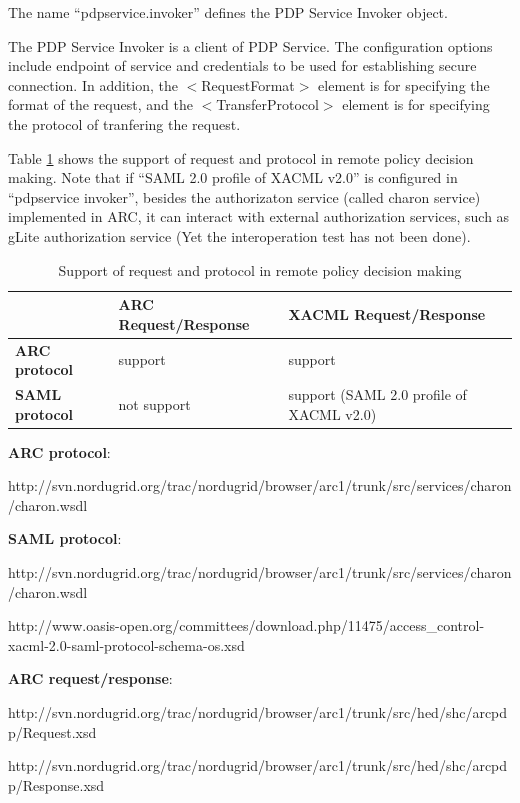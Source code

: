 \documentclass{article}                            %
\begin{document}
The name ``pdpservice.invoker'' defines the PDP Service Invoker object.

The PDP Service Invoker is a client of PDP Service. The configuration options include endpoint of service and credentials to be used for establishing secure connection. In addition, the $<$RequestFormat$>$ element is for specifying the format of the request, and the $<$TransferProtocol$>$ element is for specifying the protocol of tranfering the request.

Table \ref{table:support_pdp_request_protocol} shows the support of request and protocol in remote policy decision making. Note that if ``SAML 2.0 profile of XACML v2.0'' is configured in ``pdpservice invoker'', besides the authorizaton service (called charon service) implemented in ARC, it can interact with external authorization services, such as gLite authorization service (Yet the interoperation test has not been done).

\begin{table}[ht]
\caption{Support of request and protocol in remote policy decision making}
\centering
\begin{tabular}{| l | p{7cm} | p{5cm} |}
\hline
\textbf{  } & \textbf{ARC Request/Response} & \textbf{XACML Request/Response} \\ \hline
\textbf{ARC protocol} & support & support \\ \hline
\textbf{SAML protocol} & not support & support (SAML 2.0 profile of XACML v2.0) \\ \hline
\end{tabular}
\label{table:support_pdp_request_protocol}
\end{table}

\textbf{ARC protocol}:

http://svn.nordugrid.org/trac/nordugrid/browser/arc1/trunk/src/services/charon/charon.wsdl

\textbf{SAML protocol}:

http://svn.nordugrid.org/trac/nordugrid/browser/arc1/trunk/src/services/charon/charon.wsdl

http://www.oasis-open.org/committees/download.php/11475/access\_control-xacml-2.0-saml-protocol-schema-os.xsd

\textbf{ARC request/response}:

http://svn.nordugrid.org/trac/nordugrid/browser/arc1/trunk/src/hed/shc/arcpdp/Request.xsd

http://svn.nordugrid.org/trac/nordugrid/browser/arc1/trunk/src/hed/shc/arcpdp/Response.xsd
\end{document}
